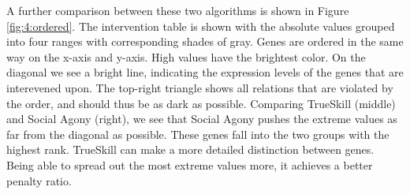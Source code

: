 A further comparison between these two algorithms is shown in Figure \ref{fig:4:ordered}. The intervention table is shown with the absolute values grouped into four ranges with corresponding shades of gray. Genes are ordered in the same way on the x-axis and y-axis. High values have the brightest color. On the diagonal we see a bright line, indicating the expression levels of the genes that are interevened upon. The top-right triangle shows all relations that are violated by the order, and should thus be as dark as possible. Comparing TrueSkill (middle) and Social Agony (right), we see that Social Agony pushes the extreme values as far from the diagonal as possible. These genes fall into the two groups with the highest rank. TrueSkill can make a more detailed distinction between genes. Being able to spread out the most extreme values more, it achieves a better penalty ratio.  
